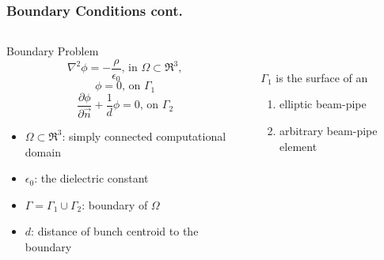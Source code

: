 \documentclass[xcolor=pdftex,table,10pt,yellow,mathserif]{beamer}
\begin{document}
\begin{frame}
		\frametitle{Boundary Conditions cont.}

		\begin{columns}
		\begin{column}{5cm}

		\begin{block}{Boundary Problem}
            \[
	    		\nabla^2 \phi = -\frac{\rho}{\epsilon_0} \text{, in } \Omega \subset \Re^3 , \nonumber 
            \]
            \[
                \phi = 0 \text{, on }\Gamma_1  
            \]
            \[
                \frac{\partial \phi}{\partial \vec{n}} + \frac {1}{d} \phi = 0  \text{, on } \Gamma_2
            \]
		\end{block}
        \begin{itemize}
		\item $\Omega \subset \Re^3$: simply connected computational domain
		\item $\epsilon_0$: the dielectric constant
        \item $\Gamma= \Gamma_1 \cup \Gamma_2$: boundary of $\Omega$
        \item $d$: distance of bunch centroid to the boundary
        \end{itemize}
		
		\end{column}
		\begin{column}{5cm}
            \begin{center}
             \\
            \end{center}
            \vspace{0.2cm} 
			$\Gamma_1$ is the surface of an
    		\begin{enumerate}
	    		\item elliptic beam-pipe
		    	\item arbitrary beam-pipe element
    		\end{enumerate}
		\end{column}
		\end{columns}
		
	\end{frame}
\end{document}
